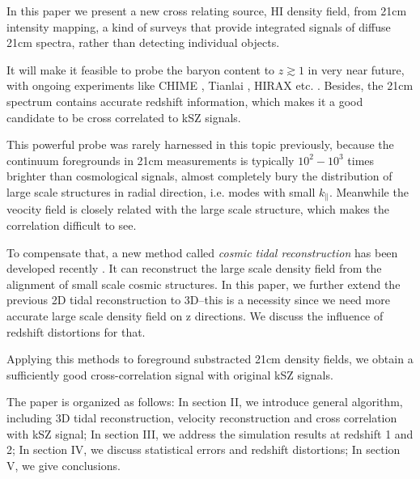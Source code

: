 In this paper we present a new cross relating source, HI density field, from 21cm intensity mapping, 
a kind of surveys that provide integrated signals of diffuse 21cm spectra, 
rather than detecting individual objects. 

It will make it feasible to probe the baryon content to $z\gtrsim1$ in very near future, with ongoing experiments like
CHIME \cite{2014SPIE.9145E..22B}, Tianlai \cite{2015ApJ...798...40X}, 
HIRAX \cite{HIRAX} etc.
.
Besides, the 21cm spectrum contains accurate redshift information, which makes it a good candidate to be cross correlated to kSZ signals.

This powerful probe was rarely harnessed in this topic previously, 
because the continuum foregrounds in 21cm measurements is typically $10^2 - 10^3$ times brighter than cosmological signals, almost completely bury the distribution of large scale structures in radial direction, i.e. modes with small $k_\parallel$.
Meanwhile the veocity field is closely related with the large scale structure, 
which makes the correlation difficult to see.

To compensate that, a new method called {\it cosmic tidal reconstruction} has been 
developed recently \cite{2012:pen}\cite{2015:zhu}. 
It can reconstruct the large scale density field from the alignment of small 
scale cosmic structures. 
In this paper, we further extend the previous 2D tidal reconstruction to 3D--this is a necessity since we need more accurate large scale density field on z directions. We discuss the influence of redshift distortions for that.

Applying this methods to foreground substracted 21cm density fields, we obtain a sufficiently good cross-correlation signal with original kSZ signals. 


The paper is organized as follows: 
In section II, we introduce general algorithm, including 3D tidal reconstruction, 
velocity reconstruction and cross correlation with kSZ signal; 
In section III, we address the simulation results at redshift 1 and 2; 
In section IV, we discuss statistical errors and redshift distortions; 
In section V, we give conclusions.
